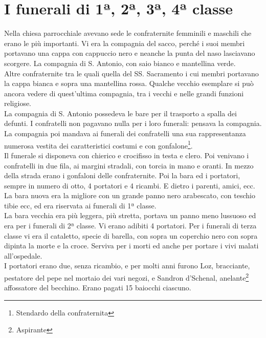 \documentclass[10pt]{memoir} %
\begin{document}

\chapter{I funerali di 1ª, 2ª, 3ª, 4ª classe}
Nella chiesa parrocchiale avevano sede le confraternite femminili e maschili che erano le più importanti. Vi era la compagnia del sacco, perché i suoi membri portavano una cappa con cappuccio nero e neanche la punta del naso lasciavano scorgere. La compagnia di S. Antonio, con saio bianco e mantellina verde.	\\
Altre confraternite tra le quali quella del SS. Sacramento i cui membri portavano la cappa bianca e sopra una mantellina rossa. Qualche vecchio esemplare si può ancora vedere di quest'ultima compagnia, tra i vecchi e nelle grandi funzioni religiose.\\
La compagnia di S. Antonio possedeva le bare per il trasporto a spalla dei defunti. I confratelli non pagavano nulla per i loro funerali: pensava la compagnia. La compagnia poi mandava ai funerali dei confratelli una sua rappresentanza numerosa vestita dei caratteristici costumi e con gonfalone\footnote{Stendardo della confraternita}.\\
Il funerale si disponeva con chierico e crocifisso in testa e clero. Poi venivano i confratelli in due fila, ai margini stradali, con torcia in mano e oranti. In mezzo della strada erano i gonfaloni delle confraternite. Poi la bara ed i portatori, sempre in numero di otto, 4 portatori e 4 ricambi. E dietro i parenti, amici, ecc. La bara nuova era la migliore con un grande panno nero arabescato, con teschio tibie ecc, ed era riservata ai funerali di 1ª classe. \\
La bara vecchia era più leggera, più stretta, portava un panno meno lussuoso ed era per i funerali di 2ª classe. Vi erano adibiti 4 portatori. Per i funerali di terza classe vi era il cataletto, specie di barella, con sopra un coperchio nero con sopra dipinta la morte e la croce. Serviva per i morti ed anche per portare i vivi malati all'ospedale.\\
I portatori erano due, senza ricambio, e per molti anni furono Loz, bracciante, pestatore del pepe nel mortaio dei vari negozi, e Sandron d'Schenal, anelante\footnote{Aspirante} affossatore del becchino. Erano pagati 15 baiocchi ciascuno.\\
\end{document}
